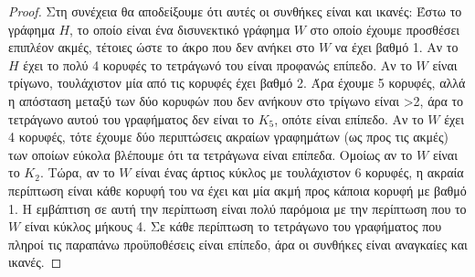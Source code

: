 \documentclass[a4paper, oneside, 11pt]{article}
\theoremstyle{definition}
\begin{document}
\begin{enumerate}
\begin{proof}
\newline\newline
Στη συνέχεια θα αποδείξουμε ότι αυτές οι συνθήκες είναι και ικανές: Έστω το γράφημα $H$, το οποίο είναι ένα δισυνεκτικό γράφημα $W$ στο οποίο έχουμε προσθέσει επιπλέον ακμές, τέτοιες ώστε το άκρο που
δεν ανήκει στο $W$ να έχει βαθμό 1. Αν το $H$ έχει το πολύ 4 κορυφές το τετράγωνό του 
είναι προφανώς επίπεδο. Αν το $W$ είναι τρίγωνο, τουλάχιστον μία από τις κορυφές έχει βαθμό 2. Άρα έχουμε 5 κορυφές, αλλά η απόσταση 
μεταξύ των δύο κορυφών που δεν ανήκουν στο τρίγωνο είναι >2, άρα το τετράγωνο αυτού του γραφήματος δεν είναι το $K_5$, οπότε είναι επίπεδο. Αν το $W$ έχει 4 κορυφές, 
τότε έχουμε δύο περιπτώσεις ακραίων γραφημάτων (ως προς τις ακμές) των οποίων εύκολα βλέπουμε ότι τα τετράγωνα είναι επίπεδα. Ομοίως αν το $W$ είναι το $K_2$. Τώρα, αν το $W$ είναι ένας άρτιος κύκλος
με τουλάχιστον 6 κορυφές, η ακραία περίπτωση είναι κάθε κορυφή του να έχει και μία ακμή προς κάποια κορυφή με βαθμό 1. Η εμβάπτιση σε αυτή την περίπτωση είναι πολύ παρόμοια με την περίπτωση που το $W$
είναι κύκλος μήκους 4. Σε κάθε περίπτωση το τετράγωνο του γραφήματος που πληροί τις παραπάνω προϋποθέσεις είναι επίπεδο, άρα οι συνθήκες είναι αναγκαίες και ικανές.

	\end{proof}


\end{enumerate}
\end{document}
